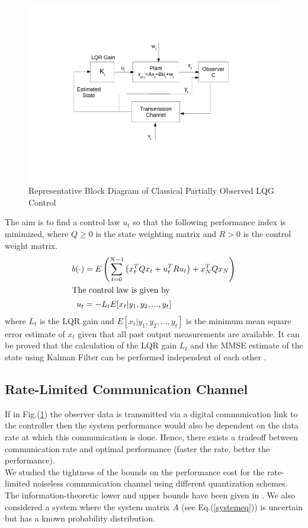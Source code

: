 \documentclass[12pt]{caltech_thesis_finalreport}
\begin{document}
	\begin{figure}[H]

			  \centering
%			  
			\includegraphics[scale=0.5]{lqg_block}
			  \caption{Representative Block Diagram of Classical Partially Observed LQG Control}
			 \label{lqg}
		\end{figure}	
	
	The aim is to find a control law $u_{t}$ so that the following performance index is minimized, where $Q \geq 0$ is the state weighting matrix and $R > 0$ is the control weight matrix. 
	\begin{align}
		b(\cdot)&=E\left(\sum\limits_{t=0}^{N-1} \left(x_{t}^{T}Qx_{t} + u_{t}^{T}Ru_{t}\right) + x_{N}^{T}Qx_{N} \right)\\
	\intertext{The control law is given by}
	\label{controleq}
	u_{t}&=-L_{t}E[x_{t}|y_{1},y_{2},...,y_{t}]
	\end{align}
	 where $L_{t}$ is the LQR gain and $E[x_{t}|y_{1},y_{2},...,y_{t}]$ is the minimum mean square error estimate of $x_{t}$ given that all past output measurements are available. It can be proved that the calculation of the LQR gain $L_{t}$ and the MMSE estimate of the state using Kalman Filter can be performed independent of each other \cite{book}. 
	\subsection{Rate-Limited Communication Channel}
	If in Fig.(\ref{lqg}) the observer data is transmitted via a digital communication link to the controller then the system performance would also be dependent on the data rate at which this communication is done. Hence, there exists a tradeoff between communication rate and optimal performance (faster the rate, better the performance). \\We studied the tightness of the bounds on the performance cost for the rate-limited noiseless communication channel using different quantization schemes. The information-theoretic lower and upper bounds have been given in \cite{victoria}. We also considered a system where the system matrix $A$ (see Eq.(\ref{systemeq})) is uncertain but has a known probability distribution. 
\end{document}
